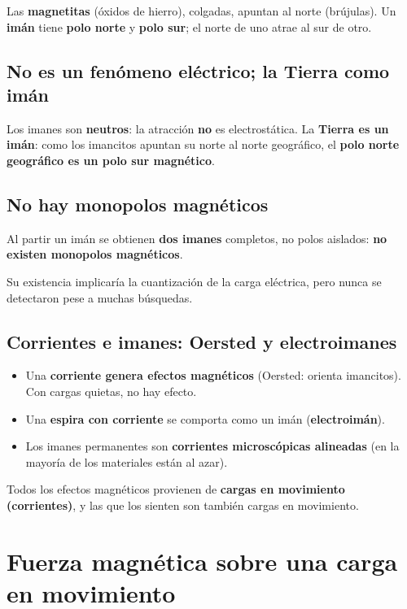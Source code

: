 \documentclass[12pt,a4paper]{article}
\begin{document}
Las \textbf{magnetitas} (óxidos de hierro), colgadas, apuntan al norte
(brújulas). Un \textbf{imán} tiene \textbf{polo norte} y \textbf{polo
sur}; el norte de uno atrae al sur de otro.

\subsection{No es un fenómeno eléctrico; la Tierra como imán}

Los imanes son \textbf{neutros}: la atracción \textbf{no} es
electrostática. La \textbf{Tierra es un imán}: como los imancitos apuntan
su norte al norte geográfico, el \textbf{polo norte geográfico es un polo
sur magnético}.

\subsection{No hay monopolos magnéticos}

Al partir un imán se obtienen \textbf{dos imanes} completos, no polos
aislados: \textbf{no existen monopolos magnéticos}.

\begin{notebox}[Curiosidad]
  Su existencia implicaría la cuantización de la carga eléctrica, pero
  nunca se detectaron pese a muchas búsquedas.
\end{notebox}

\subsection{Corrientes e imanes: Oersted y electroimanes}

\begin{itemize}[nosep]
  \item Una \textbf{corriente genera efectos magnéticos} (Oersted:
        orienta imancitos). Con cargas quietas, no hay efecto.
  \item Una \textbf{espira con corriente} se comporta como un imán
        (\textbf{electroimán}).
  \item Los imanes permanentes son \textbf{corrientes microscópicas
        alineadas} (en la mayoría de los materiales están al azar).
\end{itemize}

Todos los efectos magnéticos provienen de \textbf{cargas en movimiento
(corrientes)}, y las que los sienten son también cargas en movimiento.

\section{Fuerza magnética sobre una carga en movimiento}
\end{document}
